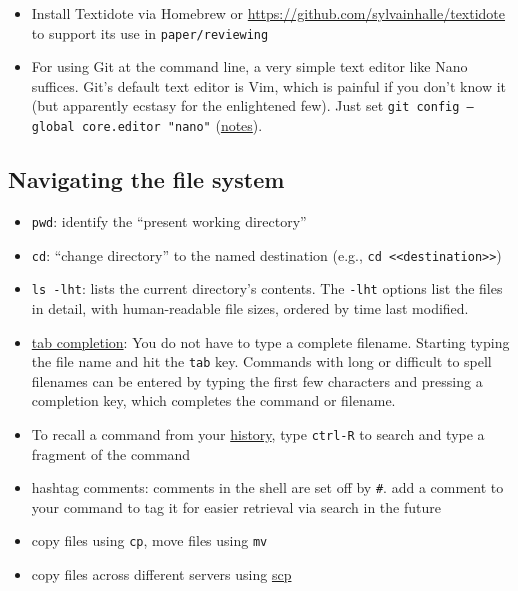 \begin{itemize}
see \url{https://github.com/mcaceresb/stata-gtools/issues/73}.
\item
Install Textidote via Homebrew or \url{https://github.com/sylvainhalle/textidote} to support its use in \texttt{paper/reviewing}
\item
For using Git at the command line, a very simple text editor like Nano suffices.
Git's default text editor is Vim, which is painful if you don't know it (but apparently ecstasy for the enlightened few).
Just set \texttt{git config --global core.editor "nano"}
(\href{https://www.macinstruct.com/tutorials/how-to-set-nano-as-the-default-editor-for-git-on-your-mac/}{notes}).
\end{itemize}

\subsection{Navigating the file system}

\begin{itemize}
	\item \texttt{pwd}: identify the ``present working directory''
	\item \texttt{cd}: ``change directory'' to the named destination (e.g., \texttt{cd <<destination>>})
	\item \texttt{ls -lht}: lists the current directory's contents. The \texttt{-lht} options list the files in detail, with human-readable file sizes, ordered by time last modified.
	\item \href{https://en.wikipedia.org/wiki/Command-line_completion}{tab completion}:
	You do not have to type a complete filename. Starting typing the file name and hit the \texttt{tab} key.
	Commands with long or difficult to spell filenames can be entered by typing the first few characters and pressing a completion key, which completes the command or filename.
	\item To recall a command from your \href{https://www.howtogeek.com/howto/44997/how-to-use-bash-history-to-improve-your-command-line-productivity/}{history}, type \texttt{ctrl-R} to search and type a fragment of the command
	\item hashtag comments: comments in the shell are set off by \texttt{\#}. add a comment to your command to tag it for easier retrieval via search in the future
	\item copy files using \texttt{cp}, move files using \texttt{mv}
	\item copy files across different servers using \href{https://kb.iu.edu/d/agye}{scp}
\end{itemize}

